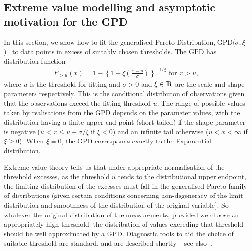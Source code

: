 \documentclass[10pt]{article}\usepackage[]{graphicx}\usepackage[]{color}
\def\IR{\hbox{{\rm I}\kern -0.2em\hbox{{\rm R}}}}
\begin{document}
\subsection{Extreme value modelling and asymptotic motivation for the GPD}
%
In this section, we show how to fit the generalised Pareto Distribution,
GPD($\sigma, \xi$)~\cite{davisonSmith} to
data points in excess of suitably chosen thresholds.
The GPD has distribution function
\begin{eqnarray}
\label{eqn:genParetoDistnFun}
F_{>u}(x)=1-\left\{1+\xi\left(\frac{x-u}{\sigma}\right)\right\}^{-1/\xi}
\mbox{ for }x>u,
\end{eqnarray}
where $u$ is the threshold for fitting and $\sigma>0$ and $\xi \in
\IR$ are the scale and shape parameters respectively.  This is the
conditional distributon of observations given that the observations
exceed the fitting threshold $u$. The range of possible values taken
by realisations from the GPD depends on the parameter values, with the
distribution having a finite upper end point (short tailed) if the
shape parameter is negative ($u<x\leq u-\sigma/\xi$ if $\xi<0$) and an
infinite tail otherwise ($u<x<\infty$ if $\xi\geq 0$).  When $\xi=0$, the GPD corresponds exactly to the Exponential distribution.

Extreme value theory tells us that under appropriate normalisation of
the threshold excesses, as the threshold $u$ tends to the
distributional upper endpoint, the limiting distribution of the
excesses must fall in the generalised Pareto family of distributions
(given certain conditions concerning non-degeneracy of the limit
distribution and smoothness of the distribution of the original
variable). So whatever the original distribution of the measurements,
provided we choose an appropriately high threshold, the distribution
of values exceeding that threshold should be well approximated by a
GPD.  Diagnostic tools to aid the choice of suitable threshold are
standard, and are described shortly -- see also~\cite{coles}.
%
\end{document}
